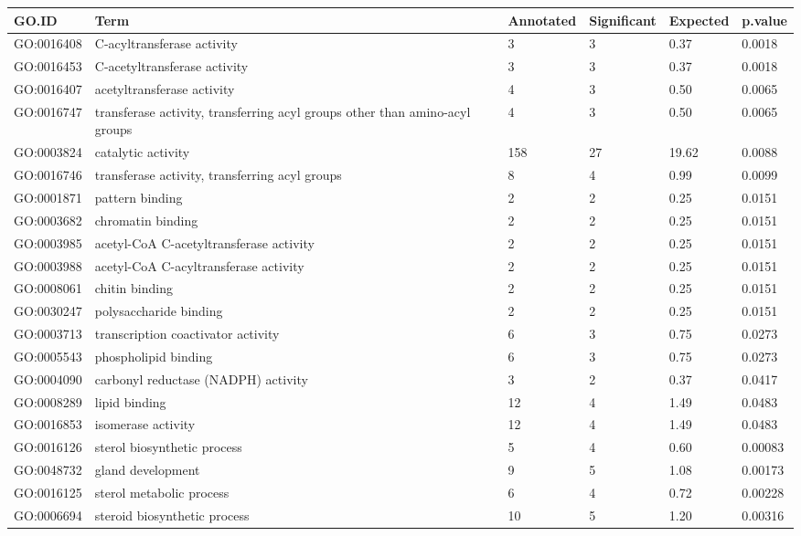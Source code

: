 \documentclass[10pt]{bmc_article}
\newenvironment{bmcformat}{\begin{raggedright}\baselineskip20pt\sloppy\setboolean{publ}{false}}{\end{raggedright}\baselineskip20pt\sloppy}
\begin{document}
\begin{bmcformat}
\begin{longtable}{lp{3cm}llll}
 GO.ID & Term & Annotated & Significant & Expected & p.value \\ 
  \hline
GO:0016408 & C-acyltransferase activity &   3 &   3 & 0.37 & 0.0018 \\ 
  GO:0016453 & C-acetyltransferase activity &   3 &   3 & 0.37 & 0.0018 \\ 
  GO:0016407 & acetyltransferase activity &   4 &   3 & 0.50 & 0.0065 \\ 
  GO:0016747 & transferase activity, transferring acyl groups other than amino-acyl groups &   4 &   3 & 0.50 & 0.0065 \\ 
  GO:0003824 & catalytic activity & 158 &  27 & 19.62 & 0.0088 \\ 
  GO:0016746 & transferase activity, transferring acyl groups &   8 &   4 & 0.99 & 0.0099 \\ 
  GO:0001871 & pattern binding &   2 &   2 & 0.25 & 0.0151 \\ 
  GO:0003682 & chromatin binding &   2 &   2 & 0.25 & 0.0151 \\ 
  GO:0003985 & acetyl-CoA C-acetyltransferase activity &   2 &   2 & 0.25 & 0.0151 \\ 
  GO:0003988 & acetyl-CoA C-acyltransferase activity &   2 &   2 & 0.25 & 0.0151 \\ 
  GO:0008061 & chitin binding &   2 &   2 & 0.25 & 0.0151 \\ 
  GO:0030247 & polysaccharide binding &   2 &   2 & 0.25 & 0.0151 \\ 
  GO:0003713 & transcription coactivator activity &   6 &   3 & 0.75 & 0.0273 \\ 
  GO:0005543 & phospholipid binding &   6 &   3 & 0.75 & 0.0273 \\ 
  GO:0004090 & carbonyl reductase (NADPH) activity &   3 &   2 & 0.37 & 0.0417 \\ 
  GO:0008289 & lipid binding &  12 &   4 & 1.49 & 0.0483 \\ 
  GO:0016853 & isomerase activity &  12 &   4 & 1.49 & 0.0483 \\ 
   \hline
GO:0016126 & sterol biosynthetic process &   5 &   4 & 0.60 & 0.00083 \\ 
  GO:0048732 & gland development &   9 &   5 & 1.08 & 0.00173 \\ 
  GO:0016125 & sterol metabolic process &   6 &   4 & 0.72 & 0.00228 \\ 
  GO:0006694 & steroid biosynthetic process &  10 &   5 & 1.20 & 0.00316 \\ 

\end{longtable}
\end{bmcformat}
\end{document}
